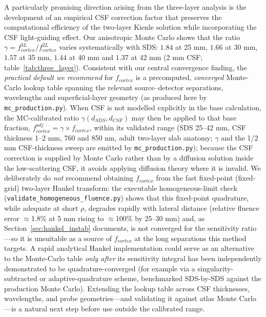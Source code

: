 \documentclass[11pt]{article}
\def\mathrm#1{#1}%
\def\,{ }%
\begin{document}
A particularly promising direction arising from the three-layer analysis is the development of an empirical CSF correction factor that preserves the computational efficiency of the two-layer Kienle solution while incorporating the CSF light-guiding effect. Our anisotropic Monte Carlo shows that the ratio $\gamma = f_{\mathrm{cortex}}^{\mathrm{3L}} / f_{\mathrm{cortex}}^{\mathrm{2L}}$ varies systematically with SDS: $1.84$ at 25\,mm, $1.66$ at 30\,mm, $1.57$ at 35\,mm, $1.44$ at 40\,mm and $1.37$ at 42\,mm (2\,mm CSF; table~\ref{tab:three_layer}). Consistent with our central convergence finding, the \emph{practical default we recommend} for $f_{\mathrm{cortex}}$ is a precomputed, \emph{converged} Monte-Carlo lookup table spanning the relevant source--detector separations, wavelengths and superficial-layer geometry (as produced here by \texttt{mc\_production.py}). When CSF is not modelled explicitly in the base calculation, the MC-calibrated ratio $\gamma(d_{\mathrm{SDS}}, d_{\mathrm{CSF}})$ may then be applied to that base fraction, $f_{\mathrm{cortex}}^{\mathrm{adj}} = \gamma \times f_{\mathrm{cortex}}$, within its validated range (SDS 25--42\,mm, CSF thickness 1--2\,mm, 760 and 850\,nm, adult two-layer slab anatomy; $\gamma$ and the 1/2\,mm CSF-thickness sweep are emitted by \texttt{mc\_production.py}); because the CSF correction is supplied by Monte Carlo rather than by a diffusion solution inside the low-scattering CSF, it avoids applying diffusion theory where it is invalid. We deliberately do \emph{not} recommend obtaining $f_{\mathrm{cortex}}$ from the fast fixed-point (fixed-grid) two-layer Hankel transform: the executable homogeneous-limit check (\texttt{validate\_homogeneous\_fluence.py}) shows that this fixed-point quadrature, while adequate at short $\rho$, degrades rapidly with lateral distance (relative fluence error $\approx$1.8\% at 5\,mm rising to $\approx$100\% by 25--30\,mm) and, as Section~\ref{sec:hankel_instab} documents, is not converged for the sensitivity ratio---so it is unsuitable as a source of $f_{\mathrm{cortex}}$ at the long separations this method targets. A rapid analytical Hankel implementation could serve as an alternative to the Monte-Carlo table \emph{only after} its sensitivity integral has been independently demonstrated to be quadrature-converged (for example via a singularity-subtracted or adaptive-quadrature scheme, benchmarked SDS-by-SDS against the production Monte Carlo). Extending the lookup table across CSF thicknesses, wavelengths, and probe geometries---and validating it against atlas Monte Carlo---is a natural next step before use outside the calibrated range.
\end{document}
